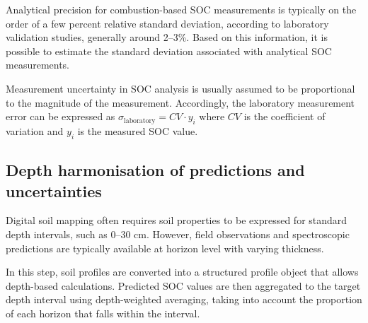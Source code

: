 \documentclass[
  10pt,
  b5paper,
  oneside]{book}
\newenvironment{Shaded}{\begin{snugshade}}{\end{snugshade}}
\newcommand{\CommentTok}[1]{\textcolor[rgb]{0.56,0.35,0.01}{\textit{#1}}}
\newcommand{\FloatTok}[1]{\textcolor[rgb]{0.00,0.00,0.81}{#1}}
\newcommand{\NormalTok}[1]{#1}
\newcommand{\OtherTok}[1]{\textcolor[rgb]{0.56,0.35,0.01}{#1}}
\newcommand{\SpecialCharTok}[1]{\textcolor[rgb]{0.81,0.36,0.00}{\textbf{#1}}}
\begin{document}
Analytical precision for combustion-based SOC measurements is typically on the order of a few percent relative standard deviation, according to laboratory validation studies, generally around 2--3\%. Based on this information, it is possible to estimate the standard deviation associated with analytical SOC measurements.

Measurement uncertainty in SOC analysis is usually assumed to be proportional to the magnitude of the measurement. Accordingly, the laboratory measurement error can be expressed as \(\sigma_{\text{laboratory}} = CV \cdot y_i\) where \(CV\) is the coefficient of variation and \(y_i\) is the measured SOC value.

\begin{Shaded}
\end{Shaded}

\subsection{Depth harmonisation of predictions and uncertainties}\label{depth-harmonisation-of-predictions-and-uncertainties}

Digital soil mapping often requires soil properties to be expressed for standard depth intervals, such as 0--30 cm. However, field observations and spectroscopic predictions are typically available at horizon level with varying thickness.

In this step, soil profiles are converted into a structured profile object that allows depth-based calculations. Predicted SOC values are then aggregated to the target depth interval using depth-weighted averaging, taking into account the proportion of each horizon that falls within the interval.
\end{document}
